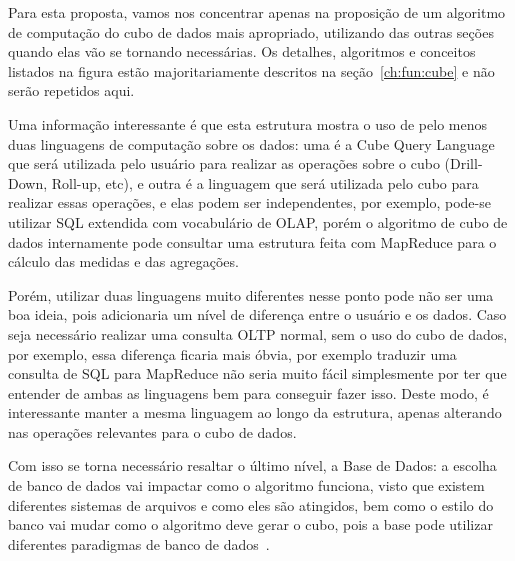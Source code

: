 Para esta proposta, vamos nos concentrar apenas na proposição de um algoritmo de computação do cubo de dados mais apropriado, utilizando das outras seções quando elas vão se tornando necessárias. Os detalhes, algoritmos e conceitos listados na figura estão majoritariamente descritos na seção~\ref{ch:fun:cube} e não serão repetidos aqui.

Uma informação interessante é que esta estrutura mostra o uso de pelo menos duas linguagens de computação sobre os dados: uma é a Cube Query Language que será utilizada pelo usuário para realizar as operações sobre o cubo (Drill-Down, Roll-up, etc), e outra é a linguagem que será utilizada pelo cubo para realizar essas operações, e elas podem ser independentes, por exemplo, pode-se utilizar SQL extendida com vocabulário de OLAP, porém o algoritmo de cubo de dados internamente pode consultar uma estrutura feita com MapReduce para o cálculo das medidas e das agregações.

Porém, utilizar duas linguagens muito diferentes nesse ponto pode não ser uma boa ideia, pois adicionaria um nível de diferença entre o usuário e os dados.
Caso seja necessário realizar uma consulta OLTP normal, sem o uso do cubo de dados, por exemplo, essa diferença ficaria mais óbvia, por exemplo traduzir uma consulta de SQL para MapReduce não seria muito fácil simplesmente por ter que entender de ambas as linguagens bem para conseguir fazer isso.
Deste modo, é interessante manter a mesma linguagem ao longo da estrutura, apenas alterando nas operações relevantes para o cubo de dados.

Com isso se torna necessário resaltar o último nível, a Base de Dados: a escolha de banco de dados vai impactar como o algoritmo funciona, visto que existem diferentes sistemas de arquivos e como eles são atingidos, bem como o estilo do banco vai mudar como o algoritmo deve gerar o cubo, pois a base pode utilizar diferentes paradigmas de banco de dados~\cite{cuzzocreaDataWarehousingOLAP2013}.

